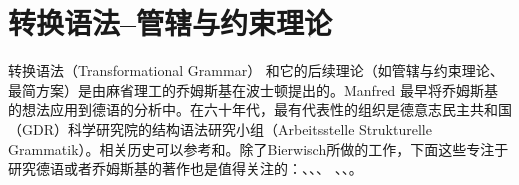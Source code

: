 
\chapter{转换语法--管辖与约束理论}
\label{Kapitel-GB}\label{chap-GB}\label{chap-gb}

转换语法（Transformational Grammar） 和它的后续理论（如管辖与约束理论、最简方案）是由麻省理工的乔姆斯基在波士顿提出的\citep{Chomsky57a,Chomsky65a,Chomsky75a,Chomsky81a,Chomsky86b,Chomsky95a-u}。Manfred \citet{Bierwisch63} 最早将乔姆斯基的想法应用到德语的分析中。在六十年代，最有代表性的组织是德意志民主共和国（GDR）科学研究院的结构语法研究小组（Arbeitsstelle Strukturelle Grammatik）。相关历史可以参考\citealp{Bierwisch92}和\citealp{Vater2010a}。除了Bierwisch所做的工作，下面这些专注于研究德语或者乔姆斯基的著作也是值得关注的：、、、
、、。

